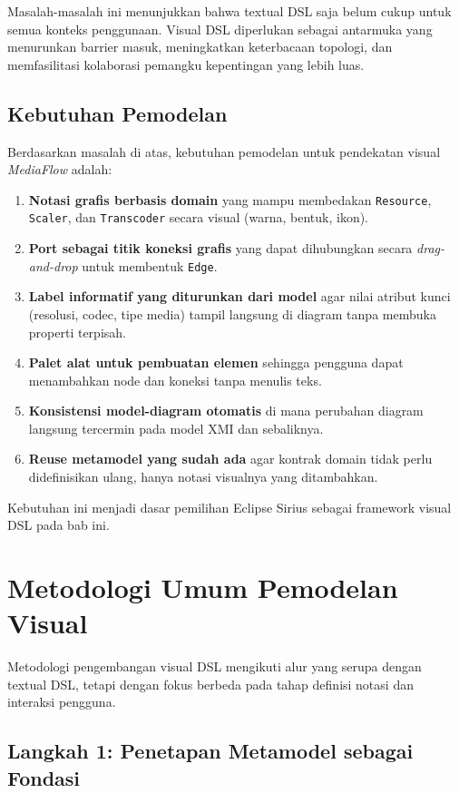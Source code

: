 Masalah-masalah ini menunjukkan bahwa textual DSL saja belum cukup untuk semua konteks penggunaan. Visual DSL diperlukan sebagai antarmuka yang menurunkan barrier masuk, meningkatkan keterbacaan topologi, dan memfasilitasi kolaborasi pemangku kepentingan yang lebih luas.

\subsection{Kebutuhan Pemodelan}

Berdasarkan masalah di atas, kebutuhan pemodelan untuk pendekatan visual \textit{MediaFlow} adalah:
\begin{enumerate}
  \item \textbf{Notasi grafis berbasis domain} yang mampu membedakan \texttt{Resource}, \texttt{Scaler}, dan \texttt{Transcoder} secara visual (warna, bentuk, ikon).
  \item \textbf{Port sebagai titik koneksi grafis} yang dapat dihubungkan secara \textit{drag-and-drop} untuk membentuk \texttt{Edge}.
  \item \textbf{Label informatif yang diturunkan dari model} agar nilai atribut kunci (resolusi, codec, tipe media) tampil langsung di diagram tanpa membuka properti terpisah.
  \item \textbf{Palet alat untuk pembuatan elemen} sehingga pengguna dapat menambahkan node dan koneksi tanpa menulis teks.
  \item \textbf{Konsistensi model-diagram otomatis} di mana perubahan diagram langsung tercermin pada model XMI dan sebaliknya.
  \item \textbf{Reuse metamodel yang sudah ada} agar kontrak domain tidak perlu didefinisikan ulang, hanya notasi visualnya yang ditambahkan.
\end{enumerate}

Kebutuhan ini menjadi dasar pemilihan Eclipse Sirius sebagai framework visual DSL pada bab ini.

\section{Metodologi Umum Pemodelan Visual}

Metodologi pengembangan visual DSL mengikuti alur yang serupa dengan textual DSL, tetapi dengan fokus berbeda pada tahap definisi notasi dan interaksi pengguna.

\subsection{Langkah 1: Penetapan Metamodel sebagai Fondasi}

